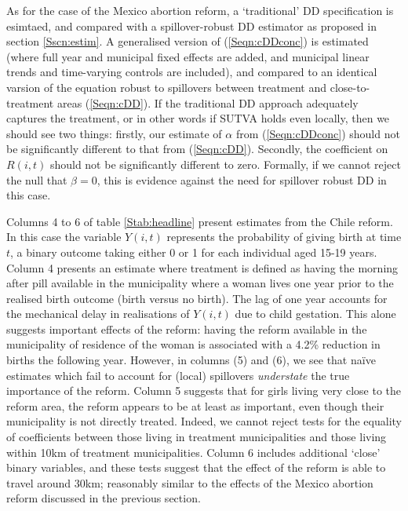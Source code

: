 \documentclass{article}
\begin{document}
\begin{spacing}{1.3}
As for the case of the Mexico abortion reform, a `traditional' DD specification
is esimtaed, and compared with a spillover-robust DD estimator as proposed in
section \ref{Sscn:estim}.  A generalised version of (\ref{Seqn:cDDconc}) is 
estimated (where full year and municipal fixed effects are added, and municipal 
linear trends and time-varying controls are included), and compared to an 
identical varsion of the equation robust to spillovers between treatment and 
close-to-treatment areas (\ref{Seqn:cDD}).  If the traditional DD approach 
adequately captures the treatment, or in other words if SUTVA holds even locally,
then we should see two things: firstly, our estimate of $\alpha$ from 
(\ref{Seqn:cDDconc}) should not be significantly different to that from 
(\ref{Seqn:cDD}). Secondly, the coefficient on $R(i,t)$ should not be 
significantly different to zero.  Formally, if we cannot reject the null that 
$\beta=0$, this is evidence against the need for spillover robust DD in this 
case.

Columns 4 to 6 of table \ref{Stab:headline} present estimates from the Chile
reform.  In this case the variable $Y(i,t)$ represents the probability of giving
birth at time $t$, a binary outcome taking either 0 or 1 for each individual aged 
15-19 years. Column 4 presents an estimate where treatment is defined as having
the morning after pill available in the municipality where a woman lives one
year prior to the realised birth outcome (birth versus no birth).  The lag of
one year accounts for the mechanical delay in realisations of $Y(i,t)$ due to 
child gestation.  This alone suggests important effects of the reform: having the
reform available in the municipality of residence of the woman is associated with
a 4.2\% reduction in births the following year.  However, in columns (5) and (6),
we see that na\"ive estimates which fail to account for (local) spillovers 
\emph{understate} the true importance of the reform.  Column 5 suggests that
for girls living very close to the reform area, the reform appears to be at least
as important, even though their municipality is not directly treated.  Indeed,
we cannot reject tests for the equality of coefficients between those living
in treatment municipalities and those living within 10km of treatment 
municipalities.  Column 6 includes additional `close' binary variables, and
these tests suggest that the effect of the reform is able to travel around 30km;
reasonably similar to the effects of the Mexico abortion reform discussed in 
the previous section.


\end{spacing}
\end{document}
